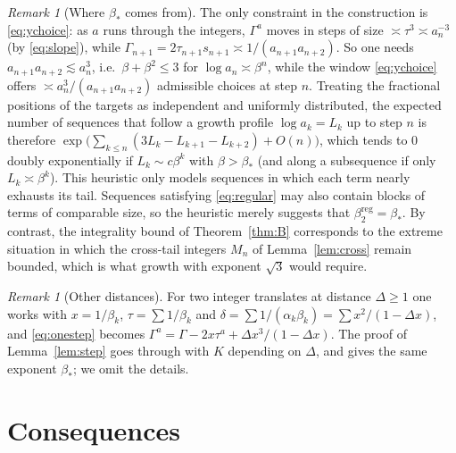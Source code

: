 \documentclass[11pt]{amsart}
\theoremstyle{definition}
\theoremstyle{remark}
\newtheorem{remark}[lemma]{Remark}
\begin{document}
\begin{remark}[Where $\beta_*$ comes from]\label{rem:heuristic}
The only constraint in the construction is \eqref{eq:ychoice}: as $a$ runs through the
integers, $\Gamma^a$ moves in steps of size $\asymp\tau^3\asymp a_n^{-3}$
(by \eqref{eq:slope}), while $\Gamma_{n+1}=2\tau_{n+1}s_{n+1}\asymp
1/(a_{n+1}a_{n+2})$. So one needs $a_{n+1}a_{n+2}\lesssim a_n^3$, i.e.\
$\beta+\beta^2\le3$ for $\log a_n\asymp\beta^n$, while the window \eqref{eq:ychoice}
offers $\asymp a_n^3/(a_{n+1}a_{n+2})$ admissible choices at step $n$. Treating the
fractional positions of the targets as independent and uniformly distributed, the
expected number of sequences that follow a growth profile $\log a_k=L_k$ up to step $n$ is
therefore
$\exp\bigl(\sum_{k\le n}(3L_k-L_{k+1}-L_{k+2})+O(n)\bigr)$, which tends to $0$ doubly
exponentially if $L_k\sim c\beta^k$ with $\beta>\beta_*$ (and along a subsequence if
only $L_k\asymp\beta^k$). This heuristic only models sequences in which each term
nearly exhausts its tail. Sequences satisfying \eqref{eq:regular} may also contain blocks
of terms of comparable size, so the heuristic merely suggests that
$\beta_2^{\mathrm{reg}}=\beta_*$. By contrast, the integrality bound of
Theorem~\ref{thm:B} corresponds to the extreme situation in which the cross-tail
integers $M_n$ of Lemma~\ref{lem:cross} remain bounded, which is what growth with
exponent $\sqrt3$ would require.
\end{remark}

\begin{remark}[Other distances]\label{rem:otherDelta}
For two integer translates at distance $\Delta\ge1$ one works with $x=1/\beta_k$,
$\tau=\sum1/\beta_k$ and $\delta=\sum1/(\alpha_k\beta_k)=\sum x^2/(1-\Delta x)$, and
\eqref{eq:onestep} becomes $\Gamma^a=\Gamma-2x\tau^a+\Delta x^3/(1-\Delta x)$. The proof
of Lemma~\ref{lem:step} goes through with $K$ depending on $\Delta$, and gives the same
exponent $\beta_*$; we omit the details.
\end{remark}

\section{Consequences}\label{sec:cor}
\end{document}
